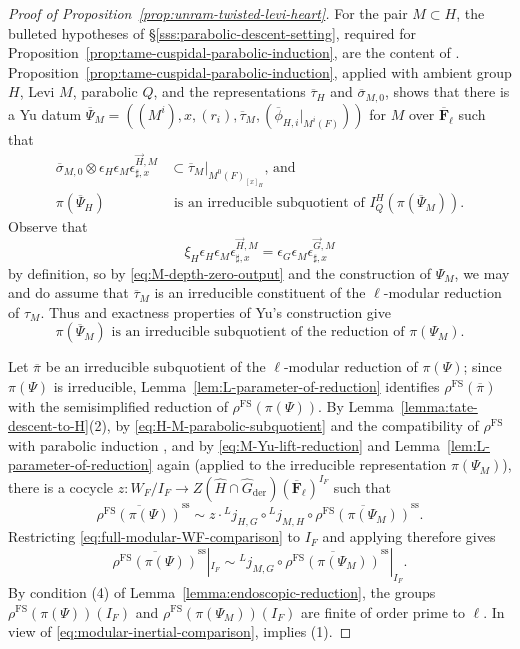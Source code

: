 \documentclass[reqno]{amsart}
\numberwithin{equation}{subsection}
\newcommand{\F}{\mathbf{F}}
\newcommand{\ol}[1]{\overline{#1}}
\newcommand{\wh}[1]{\widehat{#1}}
\newcommand{\co}{\colon}
\newcommand{\ld}{{}^L}
\DeclareMathOperator{\FS}{FS}
\DeclareMathOperator{\der}{der}
\renewcommand{\ss}{\mathrm{ss}}
\theoremstyle{remark}
\numberwithin{equation}{subsection}
\numberwithin{figure}{subsection}
\begin{document}
\begin{proof}[Proof of Proposition~\ref{prop:unram-twisted-levi-heart}]
For the pair $M \subset H$, the bulleted hypotheses of \S\ref{sss:parabolic-descent-setting}, required for Proposition~\ref{prop:tame-cuspidal-parabolic-induction}, are the content of \cite[Lemmas~9.1.2 and 9.1.1]{CF26a}. Proposition~\ref{prop:tame-cuspidal-parabolic-induction}, applied with ambient group $H$, Levi $M$, parabolic $Q$, and the representations $\ol\tau_H$ and $\ol\sigma_{M,0}$, shows that there is a Yu datum $\ol\Psi_M = ((M^i),x,(r_i),\ol\tau_M,(\ol\phi_{H,i}|_{M^i(F)}))$ for $M$ over $\ol\F_\ell$ such that
\begin{align}
\ol\sigma_{M,0}\otimes\epsilon_H\epsilon_M\epsilon_{\sharp,x}^{\vec{H},M}
&\subset
\ol\tau_M|_{M^0(F)_{[x]_H}} \text{, and}
\label{eq:M-depth-zero-output}\\
\pi(\ol\Psi_H)
&\text{ is an irreducible subquotient of }
I_Q^H(\pi(\ol\Psi_M)).
\label{eq:H-M-parabolic-subquotient}
\end{align}
Observe that
\[
\xi_H\epsilon_H\epsilon_M\epsilon_{\sharp,x}^{\vec{H},M} = \epsilon_G\epsilon_M\epsilon_{\sharp,x}^{\vec{G},M}
\]
by definition, so by \eqref{eq:M-depth-zero-output} and the construction of $\Psi_M$, we may and do assume that $\ol\tau_M$ is an irreducible constituent of the $\ell$-modular reduction of $\tau_M$. Thus \cite[Lemma~7.3.1(1)]{CF26a} and exactness properties of Yu's construction give
\begin{equation}\label{eq:M-Yu-lift-reduction}
\pi(\ol\Psi_M)
\text{ is an irreducible subquotient of the reduction of }
\pi(\Psi_M).
\end{equation}

Let $\ol\pi$ be an irreducible subquotient of the $\ell$-modular reduction of $\pi(\Psi)$; since $\pi(\Psi)$ is irreducible, Lemma~\ref{lem:L-parameter-of-reduction} identifies $\rho^{\FS}(\ol\pi)$ with the semisimplified reduction of $\rho^{\FS}(\pi(\Psi))$. By Lemma~\ref{lemma:tate-descent-to-H}(2), by \eqref{eq:H-M-parabolic-subquotient} and the compatibility of $\rho^{\FS}$ with parabolic induction \cite[Theorem I.9.6(viii)]{FS}, and by \eqref{eq:M-Yu-lift-reduction} and Lemma~\ref{lem:L-parameter-of-reduction} again (applied to the irreducible representation $\pi(\Psi_M)$), there is a cocycle $z\co W_F/I_F \to Z(\wh H \cap \wh G_{\der})(\ol\F_\ell)^{I_F}$ such that
\begin{equation}\label{eq:full-modular-WF-comparison}
\ol{\rho^{\FS}(\pi(\Psi))}^{\ss}
\sim z \cdot \ld j_{H,G}\circ\ld j_{M,H} \circ
\ol{\rho^{\FS}(\pi(\Psi_M))}^{\ss}.
\end{equation}
Restricting \eqref{eq:full-modular-WF-comparison} to $I_F$ and applying \cite[Proposition~5.3.2]{CF26a} therefore gives
\begin{equation}\label{eq:modular-inertial-comparison}
\ol{\rho^{\FS}(\pi(\Psi))}^{\ss}|_{I_F}
\sim \ld j_{M,G} \circ \ol{\rho^{\FS}(\pi(\Psi_M))}^{\ss}|_{I_F}.
\end{equation}
By condition (4) of Lemma~\ref{lemma:endoscopic-reduction}, the groups $\rho^{\FS}(\pi(\Psi))(I_F)$ and $\rho^{\FS}(\pi(\Psi_M))(I_F)$ are finite of order prime to $\ell$. In view of \eqref{eq:modular-inertial-comparison}, \cite[Lemma~5.3.2]{Cot26b} implies (1).


\end{proof}
\end{document}
